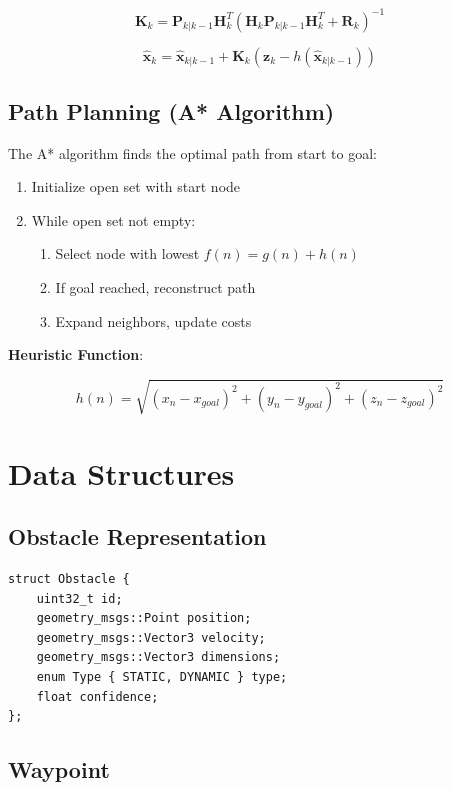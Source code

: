 \documentclass[11pt,a4paper]{article}
\begin{document}
\[
\mathbf{K}_k = \mathbf{P}_{k|k-1} \mathbf{H}_k^T (\mathbf{H}_k \mathbf{P}_{k|k-1} \mathbf{H}_k^T + \mathbf{R}_k)^{-1}
\]

\[
\hat{\mathbf{x}}_k = \hat{\mathbf{x}}_{k|k-1} + \mathbf{K}_k (\mathbf{z}_k - h(\hat{\mathbf{x}}_{k|k-1}))
\]

\subsection{Path Planning (A* Algorithm)}

The A* algorithm finds the optimal path from start to goal:

\begin{enumerate}
    \item Initialize open set with start node
    \item While open set not empty:
    \begin{enumerate}
        \item Select node with lowest $f(n) = g(n) + h(n)$
        \item If goal reached, reconstruct path
        \item Expand neighbors, update costs
    \end{enumerate}
\end{enumerate}

\textbf{Heuristic Function}:

\[
h(n) = \sqrt{(x_n - x_{goal})^2 + (y_n - y_{goal})^2 + (z_n - z_{goal})^2}
\]

\section{Data Structures}

\subsection{Obstacle Representation}

\begin{verbatim}
struct Obstacle {
    uint32_t id;
    geometry_msgs::Point position;
    geometry_msgs::Vector3 velocity;
    geometry_msgs::Vector3 dimensions;
    enum Type { STATIC, DYNAMIC } type;
    float confidence;
};
\end{verbatim}

\subsection{Waypoint}
\end{document}
